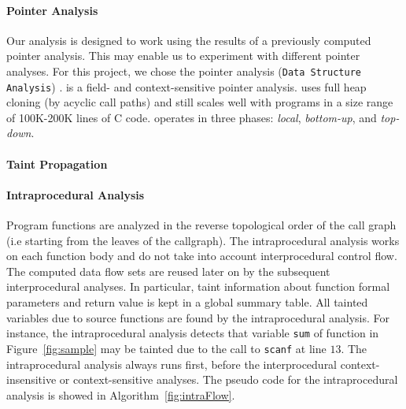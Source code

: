 \paragraph{Pointer Analysis}
Our analysis is designed to work using the results of
a previously computed pointer analysis. This may enable
us to experiment with different pointer analyses.
For this project, we chose the pointer analysis
\DSA (\texttt{Data Structure Analysis}) \cite{DSA:PLDI07}.
\DSA is a field- and context-sensitive pointer analysis.
\DSA uses full heap cloning (by acyclic call paths) and 
still scales well with programs in a size range of 100K-200K
lines of C code. 
\DSA operates in three phases: \textit{local}, \textit{bottom-up},
and \textit{top-down}.

\paragraph{Taint Propagation}

\paragraph{Intraprocedural Analysis}
Program functions are analyzed in the reverse
topological order of the call graph (i.e starting
from the leaves of the callgraph).
The intraprocedural analysis works on each function
body and do not take into account interprocedural
control flow. The computed data flow sets are reused
later on by the subsequent interprocedural analyses.
In particular, taint information about function
formal parameters and return value is kept in a
global summary table.
All tainted variables due to source functions are
found by the intraprocedural analysis. 
For instance, the intraprocedural analysis detects
that variable \texttt{sum} of function \compute{}
in Figure~\ref{fig:sample} may be tainted due to the
call to \texttt{scanf} at line $13$.
The intraprocedural analysis always runs
first, before the interprocedural context-insensitive
or context-sensitive analyses.
The pseudo code for the intraprocedural analysis
is showed in Algorithm~\ref{fig:intraFlow}.


